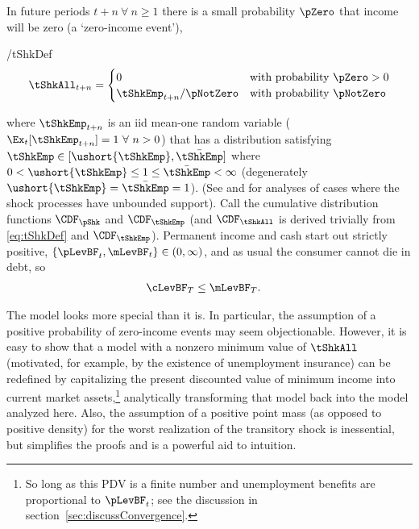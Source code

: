\documentclass[./BufferStockTheory.tex]{subfiles}
\begin{document}
In future periods $t+n ~\forall~ n \geq 1$ there is a small probability $\pZero$ that income will
be zero (a `zero-income event'),
\begin{verbatimwrite}{\EqDir/tShkDef}
\begin{equation}
\tShkAll _{t+n}=
\begin{cases}
 0\phantom{_{t+1}/\pNotZero} & \text{with probability $\pZero>0$} \\
 \tShkEmp_{t+n}/\pNotZero      & \text{with probability $\pNotZero  $} %
\end{cases} \label{eq:tShkDef}
\end{equation}
\end{verbatimwrite}

where $\tShkEmp_{t+n}$ is an iid mean-one random variable
($\Ex_{t}[{\tShkEmp}_{t+n}]=1~\forall~n>0$)
that has a distribution
satisfying $\tShkEmp \in \lbrack \ushort{\tShkEmp},\bar{\tShkEmp}\rbrack$
where $0<\ushort{\tShkEmp} \leq 1 \leq \bar{\tShkEmp}<\infty$
(degenerately $\ushort{\tShkEmp}=\bar{\tShkEmp}=1$). (See \cite{rabaultBorrowing} and \cite{lsIncFluct} for analyses of cases where the shock processes have unbounded support).  Call the cumulative
distribution functions $\CDF_{\pShk}$ and $\CDF_{\tShkEmp}$ (and $\CDF_{\tShkAll}$
is derived trivially from \eqref{eq:tShkDef} and $\CDF_{\tShkEmp}$).
Permanent income and cash start out strictly positive, $\{\pLevBF_{t},\mLevBF_{t}\} \in
(0,\infty)$, and as usual the consumer cannot die in
debt, so
\begin{align}
  \cLevBF_{T} & \leq  \mLevBF_{T} \label{eq:NoDebtAtDeath}.
\end{align}

\hypertarget{PDV}{}
The model looks more special than it is.  In particular, the
assumption of a positive probability of zero-income events may seem
objectionable.  However, it is easy to show that a model with a
nonzero minimum value of $\tShkAll$ (motivated, for example, by the
existence of unemployment insurance) can be redefined by capitalizing
the present discounted value of minimum income into current market assets,\footnote{So long
  as this PDV is a finite number and unemployment benefits are
  proportional to $\pLevBF_{t}$; see the discussion in
  section~\ref{sec:discussConvergence}.}  analytically transforming
that model back into the model analyzed here.  Also, the assumption of
a positive point mass (as opposed to positive density) for the worst
realization of the transitory shock is inessential, but simplifies the proofs and is a powerful aid to intuition.
\end{document}
